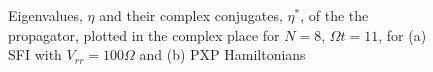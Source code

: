 \begin{figure}
  \centering
  \caption{Eigenvalues, $\eta$ and their complex conjugates, $\eta^*$,
    of the the propagator, plotted in the complex place for $N=8$,
    $\Omega t=11$, for (a) SFI with $V_{rr}=100\Omega$ and (b) PXP
    Hamiltonians}
\end{figure}


